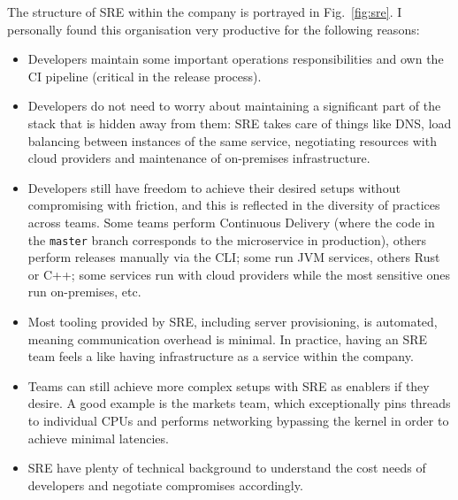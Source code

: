 \documentclass[conference]{IEEEtran}
\begin{document}
    The structure of SRE within the company is portrayed in Fig.~\ref{fig:sre}.
    I personally found this organisation very productive for the following reasons:
    \begin{itemize}
        \item Developers maintain some important operations responsibilities and own the CI pipeline (critical in the release process).
        \item Developers do not need to worry about maintaining a significant part of the stack that is hidden away from them: SRE takes care of things like DNS, load balancing between instances of the same service, negotiating resources with cloud providers and maintenance of on-premises infrastructure.
        \item Developers still have freedom to achieve their desired setups without compromising with friction, and this is reflected in the diversity of practices across teams.
        Some teams perform Continuous Delivery (where the code in the \texttt{master} branch corresponds to the microservice in production), others perform releases manually via the CLI; some run JVM services, others Rust or C++;
        some services run with cloud providers while the most sensitive ones run on-premises, etc.
        \item Most tooling provided by SRE, including server provisioning, is automated, meaning communication overhead is minimal.
        In practice, having an SRE team feels a like having infrastructure as a service within the company.
        \item Teams can still achieve more complex setups with SRE as enablers
        if they desire.
        A good example is the markets team, which exceptionally pins threads to individual CPUs and performs networking bypassing the kernel in order to achieve minimal latencies.
        \item SRE have plenty of technical background to understand the cost needs of developers and negotiate compromises accordingly.
    \end{itemize}
\end{document}

